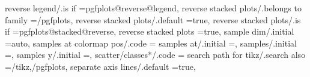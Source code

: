 {{{{{{{{{{{{{{{{{{{{{{{{{{{{{{{{{{{{{{{{{{{{{{{{{{{{{{{{{{{{{{{{{{{{{{{{{{{{{reverse legend/.is if                                              =pgfplots@reverse@legend,                                                                                                           
reverse stacked plots/.belongs to family                           =/pgfplots,                                                                                                                         
reverse stacked plots/.default                                     =true,                                                                                                                              
reverse stacked plots/.is if                                       =pgfplots@stacked@reverse,                                                                                                          
reverse stacked plots                                              =true,                                                                                                                              
sample dim/.initial                                                =auto,                                                                                                                              
samples at colormap pos/.code                                      ={%
samples at/.initial                                                =,%
samples/.initial                                                   =,%
samples y/.initial                                                 =,%
scatter/classes*/.code                                             ={%
search path for tikz/.search also                                  ={/tikz,/pgfplots},                                                                                                                 
separate axis lines/.default                                       =true,                                                                                                                              
}}}}}}}}}}}}}}}}}}}}}}}}}}}}}}}}}}}}}}}}}}}}}}}}}}}}}}}}}}}}}}}}}}}}}}}}}}}}}}}
